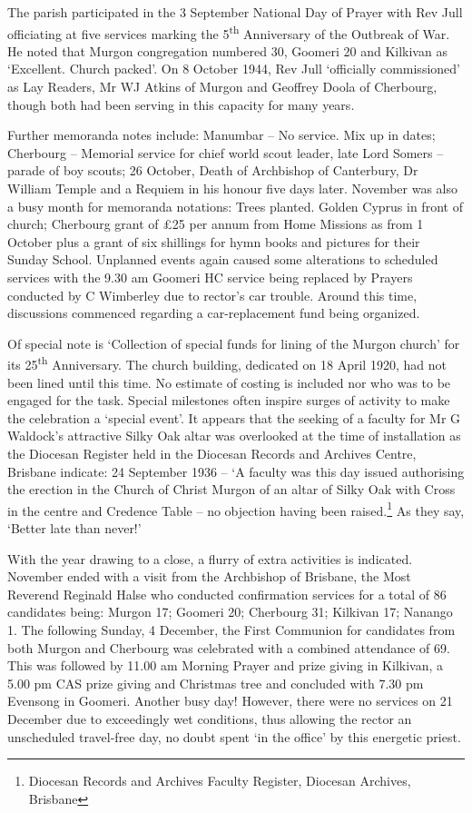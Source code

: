 The parish participated in the 3 September National Day of Prayer with Rev Jull officiating at five services marking the 5\textsuperscript{th} Anniversary of the Outbreak of War. He noted that Murgon congregation numbered 30, Goomeri 20 and Kilkivan as `Excellent. Church packed'. On 8 October 1944, Rev Jull `officially commissioned' as Lay Readers, Mr WJ Atkins of Murgon and Geoffrey Doola of Cherbourg, though both had been serving in this capacity for many years.



Further memoranda notes include: Manumbar -- No service. Mix up in dates; Cherbourg -- Memorial service for chief world scout leader, late Lord Somers -- parade of boy scouts; 26 October, Death of Archbishop of Canterbury, Dr William Temple and a Requiem in his honour five days later. November was also a busy month for memoranda notations: Trees planted. Golden Cyprus in front of church; Cherbourg grant of \pounds25 per annum from Home Missions as from 1 October plus a grant of six shillings for hymn books and pictures for their Sunday School. Unplanned events again caused some alterations to scheduled services with the 9.30 am Goomeri HC service being replaced by Prayers conducted by C Wimberley due to rector's car trouble. Around this time, discussions commenced regarding a car-replacement fund being organized.



Of special note is `Collection of special funds for lining of the Murgon church' for its 25\textsuperscript{th} Anniversary. The church building, dedicated on 18 April 1920, had not been lined until this time. No estimate of costing is included nor who was to be engaged for the task. Special milestones often inspire surges of activity to make the celebration a `special event'. It appears that the seeking of a faculty for Mr G Waldock's attractive Silky Oak altar was overlooked at the time of installation as the Diocesan Register held in the Diocesan Records and Archives Centre, Brisbane indicate: 24 September 1936 -- `A faculty was this day issued authorising the erection in the Church of Christ Murgon of an altar of Silky Oak with Cross in the centre and Credence Table -- no objection having been raised.\footnote{Diocesan Records and Archives Faculty Register, Diocesan Archives, Brisbane} As they say, `Better late than never!'


With the year drawing to a close, a flurry of extra activities is indicated. November ended with a visit from the Archbishop of Brisbane, the Most Reverend Reginald Halse who conducted confirmation services for a total of 86 candidates being: Murgon 17; Goomeri 20; Cherbourg 31; Kilkivan 17; Nanango 1. The following Sunday, 4 December, the First Communion for candidates from both Murgon and Cherbourg was celebrated with a combined attendance of 69. This was followed by 11.00 am Morning Prayer and prize giving in Kilkivan, a 5.00 pm CAS prize giving and Christmas tree and concluded with 7.30 pm Evensong in Goomeri. Another busy day! However, there were no services on 21 December due to exceedingly wet conditions, thus allowing the rector an unscheduled travel-free day, no doubt spent `in the office' by this energetic priest.



